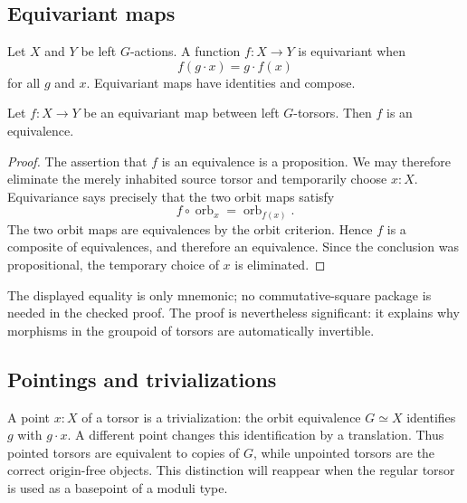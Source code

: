 
\subsection{Equivariant maps}
\begin{definition}
Let $X$ and $Y$ be left $G$-actions. A function $f:X\to Y$ is equivariant when
\begin{equation}
f(g\cdot x)=g\cdot f(x)
\end{equation}
for all $g$ and $x$. Equivariant maps have identities and compose.
\end{definition}

\begin{proposition}
Let $f:X\to Y$ be an equivariant map between left $G$-torsors. Then $f$ is an equivalence.
\end{proposition}
\begin{proof}
The assertion that $f$ is an equivalence is a proposition. We may therefore eliminate the merely inhabited source torsor and temporarily choose $x:X$. Equivariance says precisely that the two orbit maps satisfy
\begin{equation}
  f \circ \operatorname{orb}_x =
  \operatorname{orb}_{f(x)}.
\end{equation}
The two orbit maps are equivalences by the orbit criterion. Hence $f$ is a composite of equivalences, and therefore an equivalence. Since the conclusion was propositional, the temporary choice of $x$ is eliminated.
\end{proof}

The displayed equality is only mnemonic; no commutative-square package is needed in the checked proof. The proof is nevertheless significant: it explains why morphisms in the groupoid of torsors are automatically invertible.


\subsection{Pointings and trivializations}
A point $x:X$ of a torsor is a trivialization: the orbit equivalence $G\simeq X$ identifies $g$ with $g\cdot x$. A different point changes this identification by a translation. Thus pointed torsors are equivalent to copies of $G$, while unpointed torsors are the correct origin-free objects. This distinction will reappear when the regular torsor is used as a basepoint of a moduli type.
